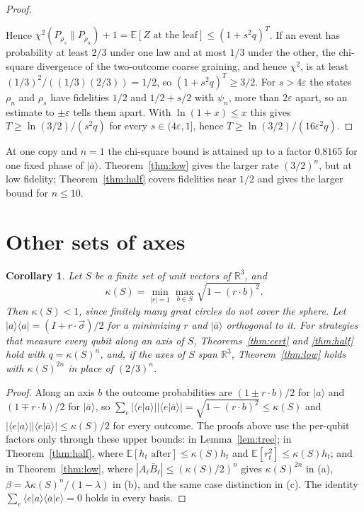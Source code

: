 \documentclass[11pt]{article}
\newtheorem{corollary}[theorem]{Corollary}
\theoremstyle{remark}
\newcommand{\eps}{\varepsilon}
\newcommand{\ket}[1]{|#1\rangle}
\newcommand{\bra}[1]{\langle #1|}
\newcommand{\abar}{\bar a}
\newcommand{\E}{\mathbb{E}}
\begin{document}
\begin{proof}
\begin{itemize}
\end{itemize}
Hence $\chi^2(P_{\rho_s}\|P_{\rho_n})+1 = \E[Z\text{ at the leaf}]\le(1+s^2q)^T$. If an event has probability at least $2/3$ under one law and at most $1/3$ under the other, the chi-square divergence of the two-outcome coarse graining, and hence $\chi^2$, is at least $(1/3)^2/((1/3)(2/3)) = 1/2$, so $(1+s^2q)^T\ge3/2$. For $s>4\eps$ the states $\rho_n$ and $\rho_s$ have fidelities $1/2$ and $1/2+s/2$ with $\psi_n$, more than $2\eps$ apart, so an estimate to $\pm\eps$ tells them apart. With $\ln(1+x)\le x$ this gives $T\ge\ln(3/2)/(s^2q)$ for every $s\in(4\eps,1]$, hence $T\ge\ln(3/2)/(16\eps^2q)$.
\end{proof}

At one copy and $n = 1$ the chi-square bound is attained up to a factor $0.8165$ for one fixed phase of $\ket\abar$. Theorem~\ref{thm:low} gives the larger rate $(3/2)^n$, but at low fidelity; Theorem~\ref{thm:half} covers fidelities near $1/2$ and gives the larger bound for $n\le10$.

\section{Other sets of axes}\label{sec:axes}

\begin{corollary}\label{cor:axes}
Let $S$ be a finite set of unit vectors of $\mathbb{R}^3$, and
\[
\kappa(S) = \min_{|r| = 1}\max_{b\in S}\sqrt{1-(r\cdot b)^2}.
\]
Then $\kappa(S)<1$, since finitely many great circles do not cover the sphere. Let $\ket a\bra a = (I+r\cdot\vec\sigma)/2$ for a minimizing $r$ and $\ket\abar$ orthogonal to it. For strategies that measure every qubit along an axis of $S$, Theorems~\ref{thm:cert} and \ref{thm:half} hold with $q = \kappa(S)^n$, and, if the axes of $S$ span $\mathbb{R}^3$, Theorem~\ref{thm:low} holds with $\kappa(S)^{2n}$ in place of $(2/3)^n$.
\end{corollary}

\begin{proof}
Along an axis $b$ the outcome probabilities are $(1\pm r\cdot b)/2$ for $\ket a$ and $(1\mp r\cdot b)/2$ for $\ket\abar$, so $\sum_e|\langle e|a\rangle||\langle e|\abar\rangle| = \sqrt{1-(r\cdot b)^2}\le\kappa(S)$ and $|\langle e|a\rangle||\langle e|\abar\rangle|\le\kappa(S)/2$ for every outcome. The proofs above use the per-qubit factors only through these upper bounds: in Lemma~\ref{lem:tree}; in Theorem~\ref{thm:half}, where $\E[h_t\text{ after}]\le\kappa(S)h_t$ and $\E[r_t^2]\le\kappa(S)h_t$; and in Theorem~\ref{thm:low}, where $|A_\ell\bar B_\ell|\le(\kappa(S)/2)^n$ gives $\kappa(S)^{2n}$ in (a), $\beta = \lambda\kappa(S)^n/(1-\lambda)$ in (b), and the same case distinction in (c). The identity $\sum_e\langle e|a\rangle\langle\abar|e\rangle = 0$ holds in every basis.
\end{proof}
\end{document}
